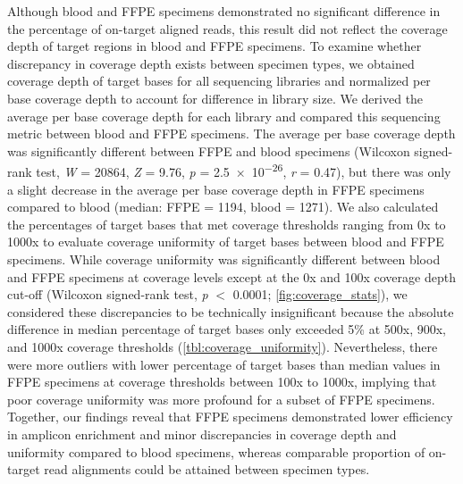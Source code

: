 Although blood and FFPE specimens demonstrated no significant difference in the percentage of on-target aligned reads, this result did not reflect the coverage depth of target regions in blood and FFPE specimens. To examine whether discrepancy in coverage depth exists between specimen types, we obtained coverage depth of target bases for all sequencing libraries and normalized per base coverage depth to account for difference in library size. We derived the average per base coverage depth for each library and compared this sequencing metric between blood and FFPE specimens. The average per base coverage depth was significantly different between FFPE and blood specimens (Wilcoxon signed-rank test, \textit{W} = \num{20864}, \textit{Z} = 9.76, \textit{p} = \num{2.5e-26}, \textit{r} = 0.47), but there was only a slight decrease in the average per base coverage depth in FFPE specimens compared to blood (median: FFPE = 1194, blood = 1271). We also calculated the percentages of target bases that met coverage thresholds ranging from 0x to 1000x to evaluate coverage uniformity of target bases between blood and FFPE specimens. While coverage uniformity was significantly different between blood and FFPE specimens at coverage levels except at the 0x and 100x coverage depth cut-off (Wilcoxon signed-rank test, \textit{p} $<$ \num{0.0001}; \autoref{fig:coverage_stats}), we considered these discrepancies to be technically insignificant because the absolute difference in median percentage of target bases only exceeded 5\% at 500x, 900x, and 1000x coverage thresholds (\autoref{tbl:coverage_uniformity}). Nevertheless, there were more outliers with lower percentage of target bases than median values in FFPE specimens at coverage thresholds between 100x to 1000x, implying that poor coverage uniformity was more profound for a subset of FFPE specimens. Together, our findings reveal that FFPE specimens demonstrated lower efficiency in amplicon enrichment and minor discrepancies in coverage depth and uniformity compared to blood specimens, whereas comparable proportion of on-target read alignments could be attained between specimen types.


